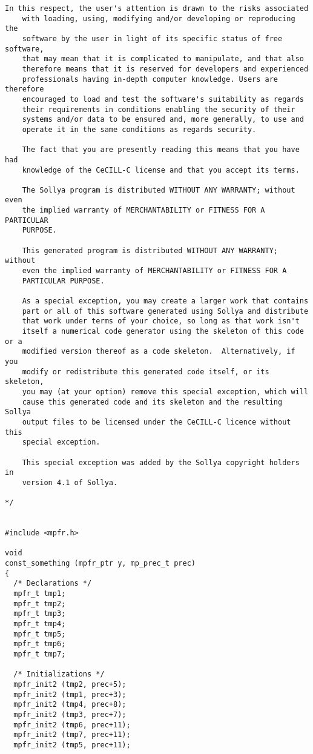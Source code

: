 \begin{center}
\begin{minipage}{15cm}
\begin{Verbatim}[frame=single]
    In this respect, the user's attention is drawn to the risks associated
    with loading, using, modifying and/or developing or reproducing the
    software by the user in light of its specific status of free software,
    that may mean that it is complicated to manipulate, and that also
    therefore means that it is reserved for developers and experienced
    professionals having in-depth computer knowledge. Users are therefore
    encouraged to load and test the software's suitability as regards
    their requirements in conditions enabling the security of their
    systems and/or data to be ensured and, more generally, to use and
    operate it in the same conditions as regards security.
    
    The fact that you are presently reading this means that you have had
    knowledge of the CeCILL-C license and that you accept its terms.
    
    The Sollya program is distributed WITHOUT ANY WARRANTY; without even
    the implied warranty of MERCHANTABILITY or FITNESS FOR A PARTICULAR
    PURPOSE.
    
    This generated program is distributed WITHOUT ANY WARRANTY; without
    even the implied warranty of MERCHANTABILITY or FITNESS FOR A
    PARTICULAR PURPOSE.
    
    As a special exception, you may create a larger work that contains
    part or all of this software generated using Sollya and distribute
    that work under terms of your choice, so long as that work isn't
    itself a numerical code generator using the skeleton of this code or a
    modified version thereof as a code skeleton.  Alternatively, if you
    modify or redistribute this generated code itself, or its skeleton,
    you may (at your option) remove this special exception, which will
    cause this generated code and its skeleton and the resulting Sollya
    output files to be licensed under the CeCILL-C licence without this
    special exception.
    
    This special exception was added by the Sollya copyright holders in
    version 4.1 of Sollya.
    
*/


#include <mpfr.h>

void
const_something (mpfr_ptr y, mp_prec_t prec)
{
  /* Declarations */
  mpfr_t tmp1;
  mpfr_t tmp2;
  mpfr_t tmp3;
  mpfr_t tmp4;
  mpfr_t tmp5;
  mpfr_t tmp6;
  mpfr_t tmp7;

  /* Initializations */
  mpfr_init2 (tmp2, prec+5);
  mpfr_init2 (tmp1, prec+3);
  mpfr_init2 (tmp4, prec+8);
  mpfr_init2 (tmp3, prec+7);
  mpfr_init2 (tmp6, prec+11);
  mpfr_init2 (tmp7, prec+11);
  mpfr_init2 (tmp5, prec+11);


\end{Verbatim}
\end{minipage}
\end{center}
